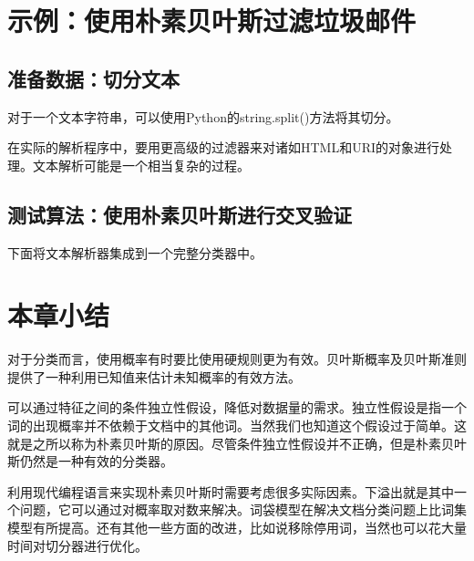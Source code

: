 \section{示例：使用朴素贝叶斯过滤垃圾邮件}
\subsection{准备数据：切分文本}
对于一个文本字符串，可以使用Python的string.split()方法将其切分。

在实际的解析程序中，要用更高级的过滤器来对诸如HTML和URI的对象进行处理。文本解析可能是一个相当复杂的过程。

\subsection{测试算法：使用朴素贝叶斯进行交叉验证}
下面将文本解析器集成到一个完整分类器中。

\section{本章小结}
对于分类而言，使用概率有时要比使用硬规则更为有效。贝叶斯概率及贝叶斯准则提供了一种利用已知值来估计未知概率的有效方法。

可以通过特征之间的条件独立性假设，降低对数据量的需求。独立性假设是指一个词的出现概率并不依赖于文档中的其他词。当然我们也知道这个假设过于简单。这就是之所以称为朴素贝叶斯的原因。尽管条件独立性假设并不正确，但是朴素贝叶斯仍然是一种有效的分类器。

利用现代编程语言来实现朴素贝叶斯时需要考虑很多实际因素。下溢出就是其中一个问题，它可以通过对概率取对数来解决。词袋模型在解决文档分类问题上比词集模型有所提高。还有其他一些方面的改进，比如说移除停用词，当然也可以花大量时间对切分器进行优化。
